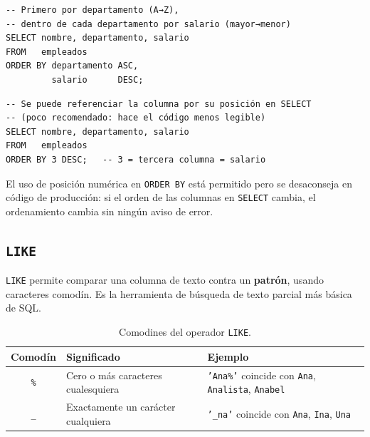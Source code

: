 \begin{lstlisting}[caption={Ordenamiento compuesto por múltiples columnas.}]
-- Primero por departamento (A→Z),
-- dentro de cada departamento por salario (mayor→menor)
SELECT nombre, departamento, salario
FROM   empleados
ORDER BY departamento ASC,
         salario      DESC;
\end{lstlisting}

\begin{lstlisting}[caption={ORDER BY usando posición numérica de columna.}]
-- Se puede referenciar la columna por su posición en SELECT
-- (poco recomendado: hace el código menos legible)
SELECT nombre, departamento, salario
FROM   empleados
ORDER BY 3 DESC;   -- 3 = tercera columna = salario
\end{lstlisting}

\begin{nota}
El uso de posición numérica en \texttt{ORDER BY} está permitido
pero se desaconseja en código de producción: si el orden de las
columnas en \texttt{SELECT} cambia, el ordenamiento cambia sin
ningún aviso de error.
\end{nota}

\subsection{\texttt{LIKE}}

\texttt{LIKE} permite comparar una columna de texto contra un
\textbf{patrón}, usando caracteres comodín.
Es la herramienta de búsqueda de texto parcial más básica de SQL.

\begin{table}[H]
\centering
\small
\renewcommand{\arraystretch}{1.4}
\begin{tabularx}{\linewidth}{@{} c l X @{}}
\toprule
\textbf{Comodín} & \textbf{Significado} & \textbf{Ejemplo} \\
\midrule
\texttt{\%} & Cero o más caracteres cualesquiera
            & \texttt{'Ana\%'} coincide con \texttt{Ana}, \texttt{Analista}, \texttt{Anabel} \\
\texttt{\_} & Exactamente un carácter cualquiera
            & \texttt{'\_na'} coincide con \texttt{Ana}, \texttt{Ina}, \texttt{Una} \\
\bottomrule
\end{tabularx}
\caption{Comodines del operador \texttt{LIKE}.}
\label{tab:comodines-like}
\end{table}

